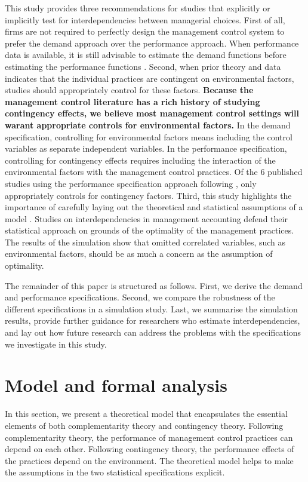 \documentclass[12pt]{article}
\begin{document}
This study provides three recommendations for studies that explicitly or implicitly test for interdependencies between managerial choices. First of all, firms are not required to perfectly design the management control system to prefer the demand approach over the performance approach. When performance data is available, it is still advisable to estimate the demand functions before estimating the performance functions \citep{Aral2012, Cassiman2006}. Second, when prior theory and data indicates that the individual practices are contingent on environmental factors, studies should appropriately control for these factors. \textbf{Because the management control literature has a rich history of studying contingency effects, we believe most management control settings will warant appropriate controls for environmental factors.} In the demand specification, controlling for environmental factors means including the control variables as separate independent variables. In the performance specification, controlling for contingency effects requires including the interaction of the environmental factors with the management control practices. Of the 6 published studies using the performance specification approach following \citet{Grabner2013}, only \citet{Bedford2016} appropriately controls for contingency factors. Third, this study highlights the importance of carefully laying out the theoretical and statistical assumptions of a model \citep{Chenhall2007}. Studies on interdependencies in management accounting defend their statistical approach on grounds of the optimality of the management practices. The results of the simulation show that omitted correlated variables, such as environmental factors, should be as much a concern as the assumption of optimality.

The remainder of this paper is structured as follows. First, we derive the demand and performance specifications. Second, we compare the robustness of the different specifications in a simulation study. Last, we summarise the simulation results, provide further guidance for researchers who estimate interdependencies, and lay out how future research can address the problems with the specifications we investigate in this study.

\section{Model and formal analysis}\label{model-and-formal-analysis}

In this section, we present a theoretical model that encapsulates the essential elements of both complementarity theory and contingency theory. Following complementarity theory, the performance of management control practices can depend on each other. Following contingency theory, the performance effects of the practices depend on the environment. The theoretical model helps to make the assumptions in the two statistical specifications explicit. 
\end{document}
